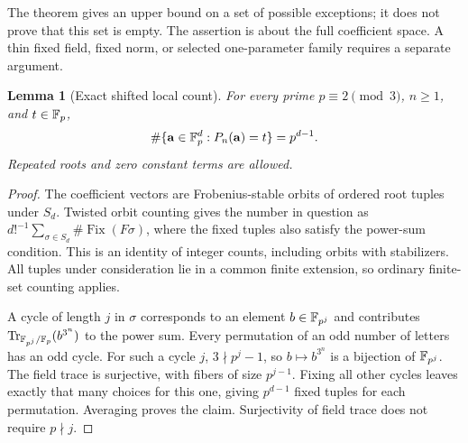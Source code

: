 \documentclass[11pt,a4paper]{article}
\newtheorem{lemma}[theorem]{Lemma}
\theoremstyle{remark}\newtheorem{remark}[theorem]{Remark}
\begin{document}
The theorem gives an upper bound on a set of possible exceptions; it
does not prove that this set is empty. The assertion is about the
full coefficient space. A thin fixed field, fixed norm, or selected
one-parameter family requires a separate argument.

\begin{lemma}[Exact shifted local count]\label{lem:shiftedcount}
For every prime $p\equiv2\pmod3$, $n\ge1$, and $t\in\mathbb F_p$,
\[
 \#\{\mathbf a\in\mathbb F_p^d:P_n(\mathbf a)=t\}=p^{d-1}.
\]
Repeated roots and zero constant terms are allowed.
\end{lemma}
\begin{proof}
The coefficient vectors are Frobenius-stable orbits of ordered root
tuples under $S_d$. Twisted orbit counting gives the number in question
as $d!^{-1}\sum_{\sigma\in S_d}\#\operatorname{Fix}(F\sigma)$,
where the fixed tuples also satisfy the power-sum condition. This is
an identity of integer counts, including orbits with stabilizers.
All tuples under consideration lie in a common finite extension, so
ordinary finite-set counting applies.

A cycle of length $j$ in $\sigma$ corresponds to an element
$b\in\mathbb F_{p^j}$ and contributes
$\operatorname{Tr}_{\mathbb F_{p^j}/\mathbb F_p}(b^{3^n})$ to the power sum.
Every permutation of an odd number of letters has an odd cycle.
For such a cycle $j$, $3\nmid p^j-1$, so $b\mapsto b^{3^n}$ is a
bijection of $\mathbb F_{p^j}$. The field trace is surjective, with fibers
of size $p^{j-1}$. Fixing all other cycles leaves exactly that many
choices for this one, giving $p^{d-1}$ fixed tuples for each
permutation. Averaging proves the claim. Surjectivity of field trace
does not require $p\nmid j$.
\end{proof}
\end{document}

